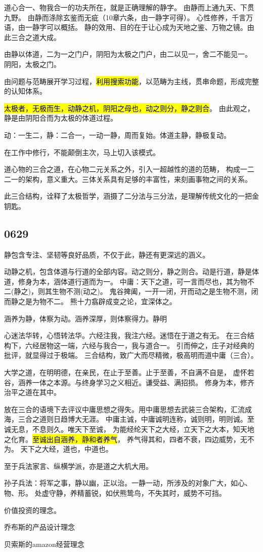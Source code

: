道心合一、物我合一的功夫所在，就是正确理解的静字。
由静而上通九天、下贯九野。
由静而涤除玄鉴而无疵（10章六条，由一静字可得）。
心性修养，千言万语，由一静字可以概括。
静的效用、目的在于让心成为天地之鉴、万物之镜。由此三合之道大成。

由静以体道，二为一之门户，阴阳为太极之门户，由二以见一，舍二不能见一。
阴阳，太极之门。


由问题与范畴展开学习过程，\hl{利用搜索功能}，以范畴为主线，贯串命题，形成完整的认知体系。

\hl{太极者，无极而生，动静之机，阴阳之母也，动之则分，静之则合}。
由此观之，静是由阴阳合而为太极的体道过程。

动：一生二，静：二合一，一动一静，周而复始。体道主静，静极复动。

在工作中修行，不能颠倒主次，马上切入该模式。

道心物的三合之道，在心物二元关系之外，引入一超越性的道的范畴，
构成一二二一的架构，意义重大。三体关系具有足够的丰富性，来刻画事物之间的关系。

此三合结构，诠释了太极哲学，涵摄了二分法与三分法，是理解传统文化的一把金钥匙。

\subsection{0629}

静包含专注、坚韧等良好品质，不仅于此，静还有更深远的涵义。

动静之机，包含体道与行道的全部内容。动之则分，静之则合。动是行道，静是体道，修身为本，涵体道行道而为一。
中庸：天下之道，可一言而尽也，其为物不二(静之)，则其生物不测(动之)。
鬼谷捭阖，一开一闭，开而动之是生物不测，闭而静之是为物不二。
熊十力翕辟成变之论，宜深体之。

涵养为静，体察为动。涵养深厚，则体察得力。静明

心迷法华转，心悟转法华。六经注我，我注六经。迷悟在于道之有无。
在三合结构下，六经居物这一端，六经与我合一，我与道合一。
引而伸之，庄子对经典的批评，就显得过于极端。
三合结构，致广大而尽精微，极高明而道中庸（三合）。

大学之道，在明明德，在亲民，在止于至善。止于至善，不自满不自是，
虚怀若谷，涵养一体之本源。与终身学习之义相近。谦受益、满招损。
修身为本，修齐治平之道在其中。

放在三合的语境下去评议中庸思想之得失。用中庸思想去武装三合架构，汇流成海，三合之道则日趋博大无涯。
中庸主诚，中庸诚明连称，诚则明，明则诚。至诚无息，不息则久。唯天下至诚，
为能经纶天下之大经，立天下之大本，知天地之化育。\hl{至诚出自涵养，静和者养气}，
养气得其和，四者不衰，四边威势，无不为。
天下之大经，道也，中道也。

至于兵法家言、纵横学派，亦是道之大机大用。

孙子兵法：将军之事，静以幽，正以治。一静一动，所涉及的对象广大，如心、物、形。
处虚守静，养精蓄锐，如伏熊鸷鸟，不失其时，威势不可挡。

价值投资的理念。

乔布斯的产品设计理念

贝索斯的amazon经营理念
